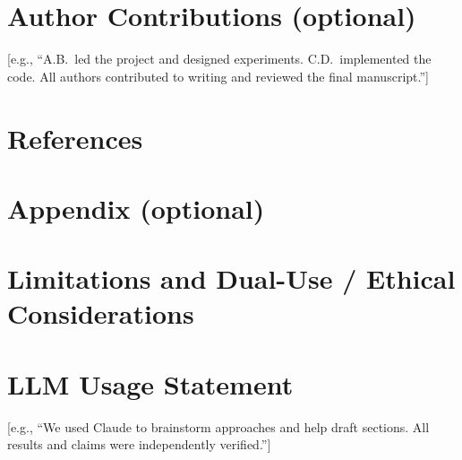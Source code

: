 \documentclass[10pt]{article}
\newif\ifshowguidance
\newcommand{\guidance}[1]{\ifshowguidance{#1\par}\fi}
\begin{document}
\section*{Author Contributions (optional)}

[e.g., ``A.B.\ led the project and designed experiments. C.D.\ implemented the code. All
authors contributed to writing and reviewed the final manuscript.'']

\section*{References}
\guidance{Use a consistent citation format. Include: Author(s), Year, Title, Venue/Publisher,
and URL or DOI where available.}
{\renewcommand{\section}[2]{}%
\nocite{apart2026collusionsprint}%

}

\appendix
\renewcommand{\thesection}{\Alph{section}}

\section*{Appendix (optional)}
\guidance{Supplementary material such as additional figures, detailed methodology, prompts
used, extended results, etc.}

\section*{Limitations and Dual-Use / Ethical Considerations}
\guidance{Required for this sprint. State what the result does and does not establish, and
any way the setup or findings could make real-world collusion easier to carry out or harder to
detect.}

\section*{LLM Usage Statement}

\guidance{If you used LLM assistance in developing your project or writing this report,
briefly note how. Ensure all claims and results have been verified.

NOTE: We strongly encourage that the final version of the submission is primarily written by your team.}

[e.g., ``We used Claude to brainstorm approaches and help draft sections. All results and
claims were independently verified.'']
\end{document}

